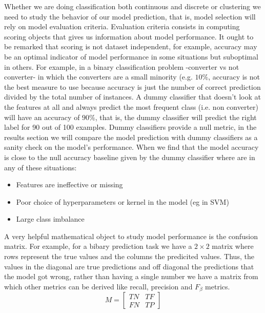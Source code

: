 \documentclass[12pt]{report}
\begin{document}
Whether we are doing classification both continuous and discrete or clustering we need to study the behavior of our model prediction, that is, model selection will rely on model evaluation criteria. Evaluation criteria consists in computing scoring objects that gives us information about model performance. It ought to be remarked that scoring is not dataset independent, for example, accuracy may be an optimal indicator of model performance in some situations but suboptimal in others. For example, in a binary classification problem -converter vs not converter- in which the converters are a small minority (e.g. $10\%$, accuracy is not the best measure to use because accuracy is just the number of correct prediction divided by the total number of instances. A dummy classifier that doesn't look at the features at all and always predict the most frequent class (i.e. non converter) will have an accuracy of $90\%$, that is, the dummy classifier will predict the right label for 90 out of 100 examples.
Dummy classifiers provide a null metric, in the results section we will compare the model prediction with dummy classifiers as a sanity check on the model's performance.
When we find that the model accuracy is close to the null accuracy baseline given by the dummy classifier where are in any of these situations:
\begin{itemize}
	\item Features are ineffective or missing
	\item Poor choice of hyperparameters or kernel in the model (eg in SVM) 
	\item Large class imbalance 
\end{itemize}
 A very helpful mathematical object to study model performance is the confusion matrix. For example, for a bibary prediction task we have a $2 \times 2$ matrix where rows represent the true values and the columns the predicited values. Thus, the values in the diagonal are true predictions and off diagonal the predictions that the model got wrong, rather  than having a single number we have a matrix from which other metrics can be derived like recall, precision and $F_\beta$ metrics.
\[
M=
  \begin{bmatrix}
    TN & TF  \\
    FN & TP 
  \end{bmatrix}
\]
\end{document}
